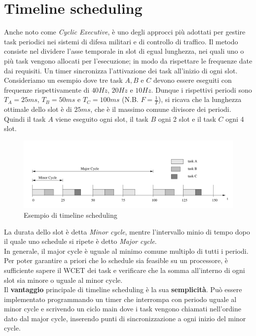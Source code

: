 \documentclass[12pt,openany,onesided]{book}
\begin{document}
\section{Timeline scheduling}
Anche noto come \textit{Cyclic Executive}, è uno degli approcci più adottati per gestire task periodici nei sistemi di difesa militari e di controllo di traffico.
Il metodo consiste nel dividere l'asse temporale in slot di egual lunghezza, nei quali uno o più task vengono allocati per l'esecuzione; in modo da rispettare le frequenze date dai requisiti.
Un timer sincronizza l'attivazione dei task all'inizio di ogni slot.\\
Consideriamo un esempio dove tre task $A,B$ e $C$ devono essere eseguiti con frequenze rispettivamente di $40Hz$, $20Hz$ e $10Hz$.
Dunque i rispettivi periodi sono $T_A=25ms$, $T_B=50ms$ e $T_C=100ms$ (N.B. $F=\frac{1}{T}$), si ricava che la lunghezza ottimale dello slot è di 
$25ms$, che è il massimo comune divisore dei periodi. Quindi il task $A$ viene eseguito ogni slot, il task $B$ ogni 2 slot e il task $C$ ogni 4 slot.
\begin{figure}[H]
    \centering
    \includegraphics[width=\textwidth]{pictures/timelineScheduling.png}
    \caption{Esempio di timeline scheduling}
\end{figure}
\noindent La durata dello slot è detta \textit{Minor cycle}, mentre l'intervallo minio di tempo dopo il quale uno schedule si ripete è detto \textit{Major cycle}.
\\
In generale, il major cycle è uguale al minimo comune multiplo di tutti i periodi. Per poter garantire a priori che lo schedule sia feasible su un processore,
è sufficiente sapere il WCET dei task e verificare che la somma all'interno di ogni slot sia minore o uguale al minor cycle.
\\
Il \textbf{vantaggio} principale di timeline scheduling è la sua \textbf{semplicità}. Può essere implementato programmando un timer che interrompa con periodo uguale al minor cycle
e scrivendo un ciclo main dove i task vengono chiamati nell'ordine dato dal major cycle, inserendo punti di sincronizzazione a ogni inizio del minor cycle.
\end{document}
